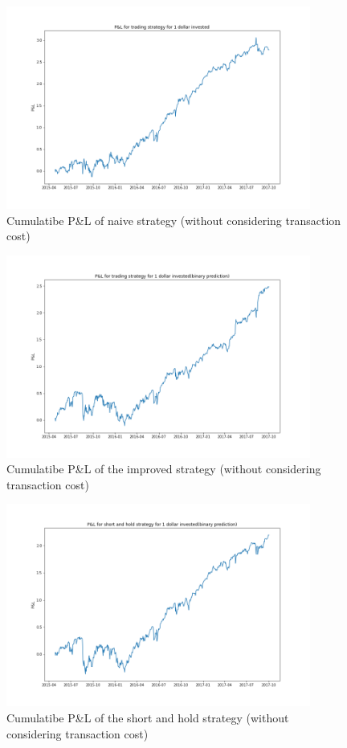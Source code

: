 \documentclass[11pt]{article}
\begin{document}
\begin{figure}[htbp]
\centering
\includegraphics[width=10cm]{Pnl_naive.png}
\caption{Cumulatibe P\&L of naive strategy (without considering transaction cost)}
\end{figure}

\begin{figure}[htbp]
\centering
\includegraphics[width=10cm]{Pnl_binary.png}
\caption{Cumulatibe P\&L of the improved strategy (without considering transaction cost)}
\end{figure}

\begin{figure}[htbp]
\centering
\includegraphics[width=10cm]{Pnl_short.png}
\caption{Cumulatibe P\&L of the short and hold strategy (without considering transaction cost)}
\end{figure}
\end{document}
